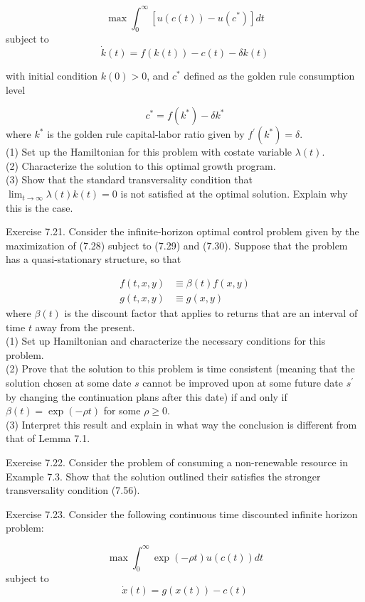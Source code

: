 \documentclass[\topdir/lecture_notes.tex]{subfiles}
\begin{document}
\[
\max \int_{0}^{\infty}\left[u(c(t))-u\left(c^{*}\right)\right] d t
\]
subject to
\[
\dot{k}(t)=f(k(t))-c(t)-\delta k(t)
\]

with initial condition $k(0)>0$, and $c^{*}$ defined as the golden rule consumption level

\[
c^{*}=f\left(k^{*}\right)-\delta k^{*}
\]
where $k^{*}$ is the golden rule capital-labor ratio given by $f^{\prime}\left(k^{*}\right)=\delta$.\\
(1) Set up the Hamiltonian for this problem with costate variable $\lambda(t)$.\\
(2) Characterize the solution to this optimal growth program.\\
(3) Show that the standard transversality condition that $\lim _{t \rightarrow \infty} \lambda(t) k(t)=0$ is not satisfied at the optimal solution. Explain why this is the case.

Exercise 7.21. Consider the infinite-horizon optimal control problem given by the maximization of (7.28) subject to (7.29) and (7.30). Suppose that the problem has a quasi-stationary structure, so that

\[
\begin{aligned}
f(t, x, y) & \equiv \beta(t) f(x, y) \\
g(t, x, y) & \equiv g(x, y)
\end{aligned}
\]
where $\beta(t)$ is the discount factor that applies to returns that are an interval of time $t$ away from the present.\\
(1) Set up Hamiltonian and characterize the necessary conditions for this problem.\\
(2) Prove that the solution to this problem is time consistent (meaning that the solution chosen at some date $s$ cannot be improved upon at some future date $s^{\prime}$ by changing the continuation plans after this date) if and only if $\beta(t)=\exp (-\rho t)$ for some $\rho \geq 0$.\\
(3) Interpret this result and explain in what way the conclusion is different from that of Lemma 7.1.

Exercise 7.22. Consider the problem of consuming a non-renewable resource in Example 7.3. Show that the solution outlined their satisfies the stronger transversality condition (7.56).

Exercise 7.23. Consider the following continuous time discounted infinite horizon problem:

\[
\max \int_{0}^{\infty} \exp (-\rho t) u(c(t)) d t
\]
subject to
\[
\dot{x}(t)=g(x(t))-c(t)
\]
\end{document}
